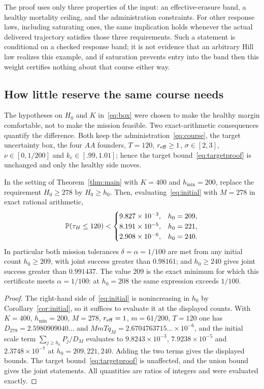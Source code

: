 The proof uses only three properties of the input: an effective-erasure band, a healthy mortality ceiling, and the administration constraints. For other response laws, including saturating ones, the same implication holds whenever the actual delivered trajectory satisfies those three requirements. Such a statement is conditional on a checked response band; it is not evidence that an arbitrary Hill law realizes this example, and if saturation prevents entry into the band then this weight certifies nothing about that course either way.

\subsection{How little reserve the same course needs}\label{sec:cheap}
The hypotheses on $H_0$ and $K$ in~\eqref{eq:box} were chosen to make the healthy margin comfortable, not to make the mission feasible. Two exact-arithmetic consequences quantify the difference. Both keep the administration~\eqref{eq:course}, the target uncertainty box, the four $AA$ founders, $T=120$, $r_{\mathrm{eff}}\ge1$, $\sigma\in[2,3]$, $\nu\in[0,1/200]$ and $k_e\in[.99,1.01]$; hence the target bound~\eqref{eq:targetproof} is unchanged and only the healthy side moves.

\begin{corollary}\label{cor:filling}
In the setting of Theorem~\ref{thm:main} with $K=400$ and $h_{\min}=200$, replace the requirement $H_0\ge278$ by $H_0\ge h_0$. Then, evaluating~\eqref{eq:initial} with $M=278$ in exact rational arithmetic,
\[
 \mathbb P(\tau_H\le120)<
 \begin{cases}
 9.827\times10^{-3},& h_0=209,\\
 8.191\times10^{-5},& h_0=221,\\
 2.908\times10^{-6},& h_0=240 .
 \end{cases}
\]
In particular both mission tolerances $\delta=\alpha=1/100$ are met from any initial count $h_0\ge209$, with joint success greater than $0.98161$; and $h_0\ge240$ gives joint success greater than $0.991437$. The value $209$ is the exact minimum for which this certificate meets $\alpha=1/100$: at $h_0=208$ the same expression exceeds $1/100$.
\end{corollary}

\begin{proof}
The right-hand side of~\eqref{eq:initial} is nonincreasing in $h_0$ by Corollary~\ref{cor:initial}, so it suffices to evaluate it at the displayed counts. With $K=400$, $h_{\min}=200$, $M=278$, $r_{\mathrm{eff}}=1$, $m=61/200$, $T=120$ one has $D_{278}=2.5980909040\ldots$ and $MmTq_M=2.6704763715\ldots\times10^{-6}$, and the initial scale term $\sum_{j\ge h_0}P_j/D_M$ evaluates to $9.8243\times10^{-3}$, $7.9238\times10^{-5}$ and $2.3748\times10^{-7}$ at $h_0=209,221,240$. Adding the two terms gives the displayed bounds. The target bound~\eqref{eq:targetproof} is unaffected, and the union bound gives the joint statements. All quantities are ratios of integers and were evaluated exactly.
\end{proof}

